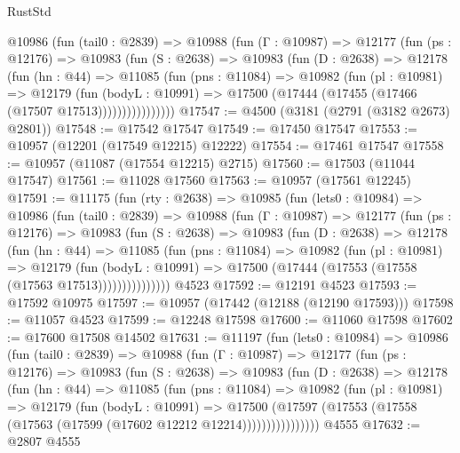 \begin{lexlean}{RustStd}
\begin{coremodule}
        @10986
          (fun (tail0 : @2839) =>
          @10988
            (fun (Γ : @10987) =>
            @12177
              (fun (ps : @12176) =>
              @10983
                (fun (S : @2638) =>
                @10983
                  (fun (D : @2638) =>
                  @12178
                    (fun (hn : @44) =>
                    @11085
                      (fun (pns : @11084) =>
                      @10982
                        (fun (pl : @10981) =>
                        @12179
                          (fun (bodyL : @10991) =>
                          @17500 (@17444 (@17455 (@17466 (@17507 @17513))))))))))))))))
@17547 := @4500 (@3181 (@2791 (@3182 @2673) @2801))
@17548 := @17542 @17547
@17549 := @17450 @17547
@17553 := @10957 (@12201 (@17549 @12215) @12222)
@17554 := @17461 @17547
@17558 := @10957 (@11087 (@17554 @12215) @2715)
@17560 := @17503 (@11044 @17547)
@17561 := @11028 @17560
@17563 := @10957 (@17561 @12245)
@17591 := @11175
    (fun (rty : @2638) =>
    @10985
      (fun (lets0 : @10984) =>
      @10986
        (fun (tail0 : @2839) =>
        @10988
          (fun (Γ : @10987) =>
          @12177
            (fun (ps : @12176) =>
            @10983
              (fun (S : @2638) =>
              @10983
                (fun (D : @2638) =>
                @12178
                  (fun (hn : @44) =>
                  @11085
                    (fun (pns : @11084) =>
                    @10982
                      (fun (pl : @10981) =>
                      @12179
                        (fun (bodyL : @10991) =>
                        @17500 (@17444 (@17553 (@17558 (@17563 @17513)))))))))))))))
    @4523
@17592 := @12191 @4523
@17593 := @17592 @10975
@17597 := @10957 (@17442 (@12188 (@12190 @17593)))
@17598 := @11057 @4523
@17599 := @12248 @17598
@17600 := @11060 @17598
@17602 := @17600 @17508 @14502
@17631 := @11197
    (fun (lets0 : @10984) =>
    @10986
      (fun (tail0 : @2839) =>
      @10988
        (fun (Γ : @10987) =>
        @12177
          (fun (ps : @12176) =>
          @10983
            (fun (S : @2638) =>
            @10983
              (fun (D : @2638) =>
              @12178
                (fun (hn : @44) =>
                @11085
                  (fun (pns : @11084) =>
                  @10982
                    (fun (pl : @10981) =>
                    @12179
                      (fun (bodyL : @10991) =>
                      @17500
                        (@17597
                          (@17553 (@17558 (@17563 (@17599 (@17602 @12212 @12214))))))))))))))))
    @4555
@17632 := @2807 @4555

\end{coremodule}
\end{lexlean}
